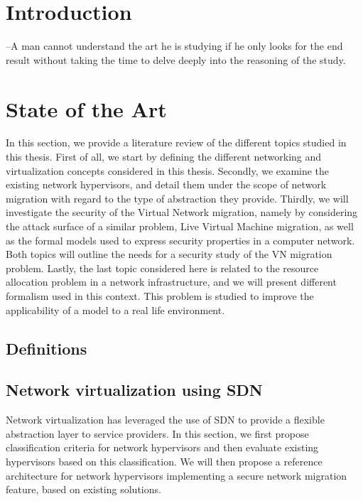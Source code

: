 \documentclass[a4paper, 11pt]{report}
\theoremstyle{definition}
\begin{document}
\newpage
{}
\chapter{Introduction}

 

\newpage
\begin{savequote}[0.5\textwidth]
--A man cannot understand the art he is studying if he only looks for the end result without taking the time to delve deeply into the reasoning of the study.
\end{savequote}
\chapter{State of the Art}
\label{sec:sota}
In this section, we provide a literature review of the different topics studied in this thesis.
First of all, we start by defining the different networking and virtualization concepts considered in this thesis.
Secondly, we examine the existing network hypervisors, and detail them under the scope of network migration with regard to the type of abstraction they provide.
Thirdly, we will investigate the security of the Virtual Network migration, namely by considering the attack surface of a similar problem, Live Virtual Machine migration, as well as the formal models used to express security properties in a computer network.
Both topics will outline the needs for a security study of the VN migration problem.
Lastly, the last topic considered here is related to the resource allocation problem in a network infrastructure, and we will present different formalism used in this context.
This problem is studied to improve the applicability of a model to a real life environment.

\section{Definitions}
\label{sec:basic_def}


\newpage
\section{Network virtualization using SDN}

Network virtualization has leveraged the use of SDN to provide a flexible abstraction layer to service providers. In this section, we first propose classification criteria for network hypervisors and then evaluate existing hypervisors based on this classification. We will then propose a reference architecture for network hypervisors implementing a secure network migration feature, based on existing solutions.
\end{document}
